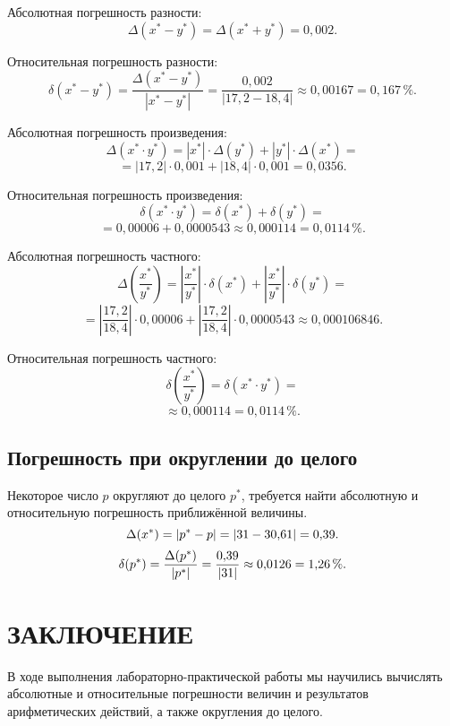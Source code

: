 \documentclass[14pt]{extarticle}
\begin{document}
Абсолютная погрешность разности:
$$\Delta(x^* - y^*)
= \Delta(x^* + y^*)
= 0{,}002.$$

Относительная погрешность разности:
$$\delta(x^* - y^*)
= \frac{\Delta(x^* - y^*)}{|x^* - y^*|}
= \frac{0{,}002}{|17{,}2 - 18{,}4|}
\approx 0{,}00167
= 0{,}167\,\%.$$

Абсолютная погрешность произведения:
$$\Delta(x^* \cdot y^*)
= |x^*| \cdot \Delta(y^*) + |y^*| \cdot \Delta(x^*)=$$
$$= |17{,}2| \cdot 0{,}001 + |18{,}4| \cdot 0{,}001
= 0{,}0356.$$

Относительная погрешность произведения:
$$\delta(x^* \cdot y^*)
= \delta(x^*) + \delta(y^*)=$$$$
= 0{,}00006 + 0{,}0000543
\approx 0{,}000114
= 0{,}0114\,\%.$$

Абсолютная погрешность частного:
$$\Delta\left(\dfrac{x^*}{y^*}\right)
= \left|\dfrac{x^*}{y^*}\right| \cdot \delta(x^*) + \left|\dfrac{x^*}{y^*}\right| \cdot \delta(y^*)=$$
$$= \left|\dfrac{17{,}2}{18{,}4}\right| \cdot 0{,}00006 + \left|\dfrac{17{,}2}{18{,}4}\right| \cdot 0{,}0000543
\approx 0{,}000106846.$$

Относительная погрешность частного:
$$\delta\left(\dfrac{x^*}{y^*}\right)
= \delta(x^* \cdot y^*)=$$
$$\approx 0{,}000114
= 0{,}0114\,\%.$$

\vspace{1.5em}\subsection{Погрешность при округлении до целого}

Некоторое число $p$ округляют до целого $p^*$, требуется найти
абсолютную и относительную погрешность приближённой величины.
$$\Delta(x^*)
= |p^* - p|
= |31 - 30{,}61|
= \answer{3a}{0{,}39}.$$
$$\delta(p^*)
= \frac{\Delta(p^*)}{|p^*|}
= \frac{0{,}39}{|31|}
\approx 0{,}0126
= \answer{3b}{1{,}26}\,\%.$$

\newpage

\section{\MakeUppercase{Заключение}}

В ходе выполнения лабораторно-практической работы мы научились вычислять абсолютные и относительные погрешности величин и результатов арифметических действий, а также округления до целого.
\end{document}
